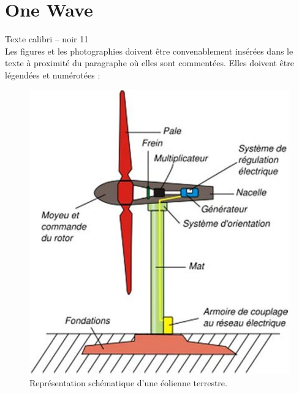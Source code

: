 \documentclass{rapportDeProjetENSICAEN}
\begin{document}
\section{One Wave}
Texte calibri – noir 11 \\
Les figures et les photographies doivent être convenablement insérées dans le texte à proximité du paragraphe où elles sont commentées. Elles doivent être légendées et numérotées :
\begin{figure}[!h]
    \centering
	\includegraphics[scale=0.425]{img/eolienneTerrestre.png}
	\caption{\textup{Représentation schématique d’une éolienne terrestre.}}
    \label{eolienneTerrestre}
\end{figure}
\newpage
\end{document}
